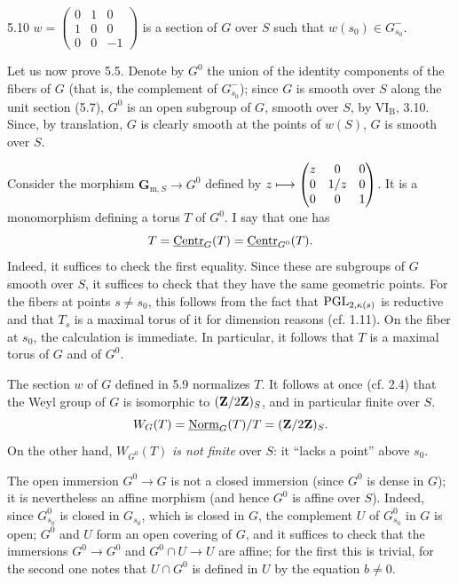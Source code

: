 \begin{lemma}{5.10}\label{XIX.5.10}
$w=\begin{pmatrix}0&1&0\\1&0&0\\0&0&-1\end{pmatrix}$ is a section of $G$ over $S$ such that $w(s_0)\in G_{s_0}^-$.
\end{lemma}
Let us now prove 5.5.{\renewcommand{\thefootnote}{(43)}} Denote by $G^0$ the union of the identity components of the fibers of $G$ (that is, the complement of $G_{s_0}^-$); since $G$ is smooth over $S$ along the unit section (5.7), $G^0$ is an open subgroup of $G$, smooth over $S$, by VI$_{\mathrm B}$, 3.10. Since, by translation, $G$ is clearly smooth at the points of $w(S)$, $G$ is smooth over $S$.

 Consider the morphism $\mathbf{G}_{\mathrm m,S}\to G^0$ defined by $z\longmapsto\begin{pmatrix}z&0&0\\0&1/z&0\\0&0&1\end{pmatrix}$. It is a monomorphism defining a torus $T$ of $G^0$. I say that one has
\[
T=\underline{\mathrm{Centr}}_G(T)=\underline{\mathrm{Centr}}_{G^0}(T).
\]
Indeed, it suffices to check the first equality. Since these are subgroups of $G$ smooth over $S$, it suffices to check that they have the same geometric points. For the fibers at points $s\ne s_0$, this follows from the fact that $\operatorname{PGL}_{2,\kappa(s)}$ is reductive and that $T_s$ is a maximal torus of it for dimension reasons (cf. 1.11). On the fiber at $s_0$, the calculation is immediate. In particular, it follows that $T$ is a maximal torus of $G$ and of $G^0$.

 The section $w$ of $G$ defined in 5.9 normalizes $T$. It follows at once (cf. 2.4) that the Weyl group of $G$ is isomorphic to $(\mathbf{Z}/2\mathbf{Z})_S$, and in particular finite over $S$.
\[
W_G(T)=\underline{\mathrm{Norm}}_G(T)/T=(\mathbf{Z}/2\mathbf{Z})_S.
\]
On the other hand, $W_{G^0}(T)$ \emph{is not finite} over $S$: it ``lacks a point'' above $s_0$.

 The open immersion $G^0\to G$ is not a closed immersion (since $G^0$ is dense in $G$); it is nevertheless an affine morphism (and hence $G^0$ is affine over $S$). Indeed, since $G_{s_0}^0$ is closed in $G_{s_0}$, which is closed in $G$, the complement $U$ of $G_{s_0}^0$ in $G$ is open; $G^0$ and $U$ form an open covering of $G$, and it suffices to check that the immersions $G^0\to G^0$ and $G^0\cap U\to U$ are affine; for the first this is trivial, for the second one notes that $U\cap G^0$ is defined in $U$ by the equation $b\ne0$.

